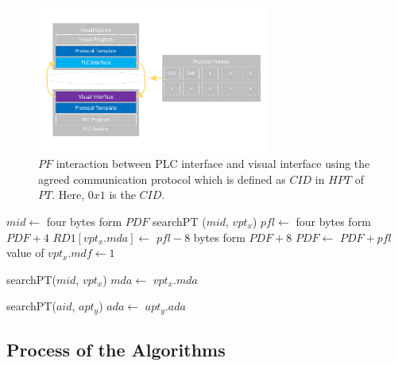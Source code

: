 \documentclass[journal,UTF8]{IEEEtran}
\begin{document}
\begin{figure}
	\centering
	\includegraphics[width=3in]{fig/FlexibleLayer.pdf}
	\caption{ $PF$ interaction between PLC interface and visual interface using the agreed communication protocol which is defined as $CID$ in $HPT$ of $PT$. Here, $0x1$ is the $CID$.}
	\label{fig:FlexibleLayer}
\end{figure}
\begin{algorithm}
	\label{alg4}
	\caption{$VCAD$}%
    $mid \leftarrow$ four bytes form $PDF$\;
    searchPT ($mid$, $vpt_x$)\;
    $pfl \leftarrow$ four bytes form $PDF+4$\; 
    $RD1[vpt_x.mda]\leftarrow$ $pfl-8$ bytes form $PDF+8$\;     	
	$PDF\leftarrow$ $PDF+pfl$\;
	value of $vpt_x.mdf\leftarrow 1$\;
\end{algorithm}

\begin{algorithm}
	\label{alg5}
	\caption{$AMD$}%
	searchPT($mid$, $vpt_x$)\;
	$mda\leftarrow$ $vpt_x.mda$\;	
\end{algorithm}

\begin{algorithm}
	\label{alg6}
	\caption{$PRD$}%
	searchPT($aid$, $apt_y$)\;
	$ada\leftarrow$ $apt_y.ada$\;
\end{algorithm}
\subsection{Process of the Algorithms}
\end{document}
